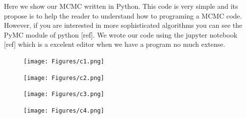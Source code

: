 \documentclass[onecolumn,           %
               showpacs,            %
               preprintnumbers,     %
               aps,                 %
               prl,          	    %
               letterpaper,             %
               superscriptaddress,      %
               nofootinbib,         %
               tightenlines,        %
               floats,floatfix      %
               ,usenatbib,
               ]{revtex4-1}
\begin{document}
Here we show our MCMC written in Python. This code is very simple and its propose is to help the reader to understand how to programing a MCMC code. However, if you are interested in more sophisticated algorithms you can see the PyMC module of python [ref]. We wrote our code using the jupyter notebook [ref] which is a excelent editor when we have a program no much extense.  

\begin{figure}[h!]
\texttt{[image: Figures/c1.png]}
\end{figure}
\begin{figure}[h!]
\texttt{[image: Figures/c2.png]}
\end{figure}
\begin{figure}[h!]
\texttt{[image: Figures/c3.png]}
\end{figure}
\begin{figure}[h!]
\texttt{[image: Figures/c4.png]}
\end{figure}
\end{document}
